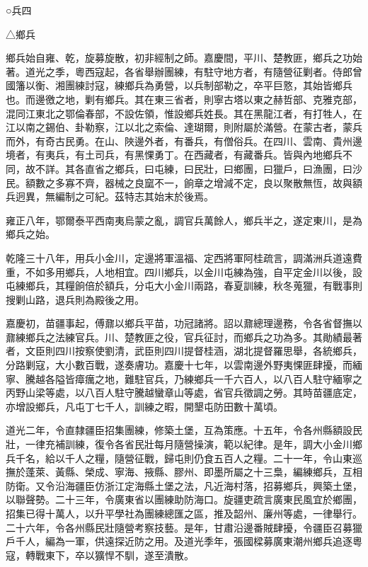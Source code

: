 
\begin{pinyinscope}
○兵四

△鄉兵

鄉兵始自雍、乾，旋募旋散，初非經制之師。嘉慶間，平川、楚教匪，鄉兵之功始著。道光之季，粵西寇起，各省舉辦團練，有駐守地方者，有隨營征剿者。侍郎曾國籓以衡、湘團練討寇，練鄉兵為勇營，以兵制部勒之，卒平巨憝，其始皆鄉兵也。而邊徼之地，剿有鄉兵。其在東三省者，則寧古塔以東之赫哲部、克雅克部，混同江東北之鄂倫春部，不設佐領，惟設鄉兵姓長。其在黑龍江者，有打牲人，在江以南之錫伯、卦勒察，江以北之索倫、達瑚爾，則附屬於滿營。在蒙古者，蒙兵而外，有奇古民勇。在山、陜邊外者，有番兵，有僧俗兵。在四川、雲南、貴州邊境者，有夷兵，有土司兵，有黑惈勇丁。在西藏者，有藏番兵。皆與內地鄉兵不同，故不詳。其各直省之鄉兵，曰屯練，曰民壯，曰鄉團，曰獵戶，曰漁團，曰沙民。額數之多寡不齊，器械之良窳不一，餉章之增減不定，良以聚散無恆，故與額兵迥異，無編制之可紀。茲特志其始末於後焉。

雍正八年，鄂爾泰平西南夷烏蒙之亂，調官兵萬餘人，鄉兵半之，遂定東川，是為鄉兵之始。

乾隆三十八年，用兵小金川，定邊將軍溫福、定西將軍阿桂疏言，調滿洲兵道遠費重，不如多用鄉兵，人地相宜。四川鄉兵，以金川屯練為強，自平定金川以後，設屯練鄉兵，其糧餉倍於額兵，分屯大小金川兩路，春夏訓練，秋冬蒐獵，有戰事則搜剿山路，退兵則為殿後之用。

嘉慶初，苗疆事起，傅鼐以鄉兵平苗，功冠諸將。詔以鼐總理邊務，令各省督撫以鼐練鄉兵之法練官兵。川、楚教匪之役，官兵征討，而鄉兵之功為多。其勛績最著者，文臣則四川按察使劉清，武臣則四川提督桂涵，湖北提督羅思舉，各統鄉兵，分路剿寇，大小數百戰，遂奏膚功。嘉慶十七年，以雲南邊外野夷惈匪肆擾，而緬寧、騰越各隘皆瘴癘之地，難駐官兵，乃練鄉兵一千六百人，以八百人駐守緬寧之丙野山梁等處，以八百人駐守騰越蠻章山等處，省官兵徵調之勞。其時苗疆底定，亦增設鄉兵，凡屯丁七千人，訓練之暇，開墾屯防田數十萬頃。

道光二年，令直隸疆臣招集團練，修築土堡，互為策應。十五年，令各州縣額設民壯，一律充補訓練，復令各省民壯每月隨營操演，範以紀律。是年，調大小金川鄉兵千名，給以千人之糧，隨營征戰，歸屯則仍食五百人之糧。二十一年，令山東巡撫於蓬萊、黃縣、榮成、寧海、掖縣、膠州、即墨所屬之十三梟，編練鄉兵，互相防衛。又令沿海疆臣仿浙江定海縣土堡之法，凡近海村落，招募鄉兵，興築土堡，以聯聲勢。二十三年，令廣東省以團練助防海口。旋疆吏疏言廣東民風宜於鄉團，招集已得十萬人，以升平學社為團練總匯之區，推及韶州、廉州等處，一律舉行。二十六年，令各州縣民壯隨營考察技藝。是年，甘肅沿邊番賊肆擾，令疆臣召募獵戶千人，編為一軍，供遠探近防之用。及道光季年，張國樑募廣東潮州鄉兵追逐粵寇，轉戰東下，卒以獷悍不馴，遂至潰散。


\end{pinyinscope}
